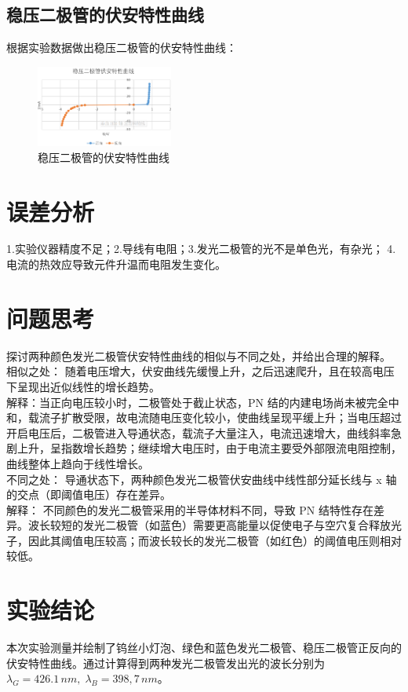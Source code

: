 \documentclass[12pt,a4paper]{article}
\begin{document}
		\subsection{稳压二极管的伏安特性曲线}
			根据实验数据做出稳压二极管的伏安特性曲线：
			\begin{figure}[H]
				\centering
				\includegraphics[width=0.4\textwidth]{稳压.png} %
				\caption{稳压二极管的伏安特性曲线}
				\label{fig:example}
		  	\end{figure}
			

	\section{误差分析}
		1.实验仪器精度不足；\qquad	2.导线有电阻；\qquad 3.发光二极管的光不是单色光，有杂光； 
		4.电流的热效应导致元件升温而电阻发生变化。



	\section{问题思考}
		探讨两种颜色发光二极管伏安特性曲线的相似与不同之处，并给出合理的解释。\\
		相似之处： 随着电压增大，伏安曲线先缓慢上升，之后迅速爬升，且在较高电压下呈现出近似线性的增长趋势。\\
		解释：当正向电压较小时，二极管处于截止状态，PN 结的内建电场尚未被完全中和，载流子扩散受限，故电流随电压变化较小，使曲线呈现平缓上升；当电压超过开启电压后，二极管进入导通状态，载流子大量注入，电流迅速增大，曲线斜率急剧上升，呈指数增长趋势；继续增大电压时，由于电流主要受外部限流电阻控制，曲线整体上趋向于线性增长。\\
		不同之处： 导通状态下，两种颜色发光二极管伏安曲线中线性部分延长线与 x 轴的交点（即阈值电压）存在差异。\\
		解释： 不同颜色的发光二极管采用的半导体材料不同，导致 PN 结特性存在差异。波长较短的发光二极管（如蓝色）需要更高能量以促使电子与空穴复合释放光子，因此其阈值电压较高；而波长较长的发光二极管（如红色）的阈值电压则相对较低。
	
	\section{实验结论}
	本次实验测量并绘制了钨丝小灯泡、绿色和蓝色发光二极管、稳压二极管正反向的伏安特性曲线。通过计算得到两种发光二极管发出光的波长分别为$\lambda_G=426.1\,nm,\;\lambda_B=398,7\,nm$。
\end{document}
